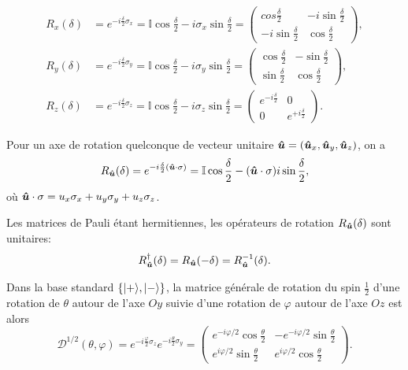 \begin{subequations}
\begin{align}
R_{x}(\delta)  &
=e^{-i\frac{\delta}{2}\sigma_{x}}=\mathbb{I}\cos\frac{\delta}{2}
-i\sigma_{x}\sin\frac{\delta}{2}=\begin{pmatrix}
cos\frac{\delta}{2} & -i\sin\frac{\delta}{2}\\
-i\sin\frac{\delta}{2} & \cos\frac{\delta}{2}
\end{pmatrix},\\
R_{y}(\delta)  &
=e^{-i\frac{\delta}{2}\sigma_{y}}=\mathbb{I}\cos\frac{\delta}{2}
-i\sigma_{y}\sin\frac{\delta}{2}=\begin{pmatrix}
\cos\frac{\delta}{2} & -\sin\frac{\delta}{2}\\
\sin\frac{\delta}{2} & \cos\frac{\delta}{2}
\end{pmatrix},\\
R_z(\delta)  &
=e^{-i\frac{\delta}{2}\sigma_z}=\mathbb{I}\cos\frac{\delta}{2}
-i\sigma_z\sin\frac{\delta}{2}=\begin{pmatrix}
e^{-i\frac{\delta}{2}} & 0\\
0 & e^{+i\frac{\delta}{2}}
\end{pmatrix}.
\end{align}%
\end{subequations}%

Pour un axe de rotation quelconque de vecteur unitaire $\bls{\hat{u}}%
=(\bls{\hat{u}}_{x},\bls{\hat{u}}_{y},\bls{\hat{u}}_z)$,
on a%
\begin{equation}
R_{\boldsymbol{\hat{u}}}(\delta)=e^{-i\frac{\delta}{2}(\boldsymbol{\hat{u}}
\cdot\sigma
)}=\mathbb{I}\cos\frac{\delta}{2}-(\boldsymbol{\hat{u}}\cdot\sigma)i\sin\frac
{\delta}{2},
\end{equation}
où
$\boldsymbol{\hat{u}}\cdot\sigma=u_{x}\sigma_{x}+u_{y}\sigma_{y}+u_z\sigma_z
$.

Les matrices de Pauli étant hermitiennes, les opérateurs de rotation
$R_{\boldsymbol{\hat{u}}}(\delta)$ sont unitaires:
\begin{equation}
R_{\boldsymbol{\hat{u}}}^{\dagger}(\delta)=R_{\boldsymbol{\hat{u}}}(-\delta
)=R_{\boldsymbol{\hat{u}}}^{-1}(\delta).
\end{equation}

Dans la base standard $\{\vert+\rangle,\vert-\rangle\}$, la matrice générale de rotation du
spin $\frac{1}{2}$ d'une rotation de $\theta$ autour de l'axe $Oy$ suivie d'une
rotation de $\varphi$ autour de l'axe $Oz$ est alors
\begin{equation}
\mathcal{D}^{1/2}(\theta,\varphi)=e^{-i\frac{\varphi}{2}\sigma_z}e^{-i\frac{
\theta}{2}\sigma_{y}}=\begin{pmatrix}
e^{-i\varphi/2}\cos\frac{\theta}{2} & -e^{-i\varphi/2}\sin\frac{\theta}{2}\\
e^{i\varphi/2}\sin\frac{\theta}{2} &
e^{i\varphi/2}\cos\frac{\theta}{2}
\end{pmatrix}.
\end{equation}


